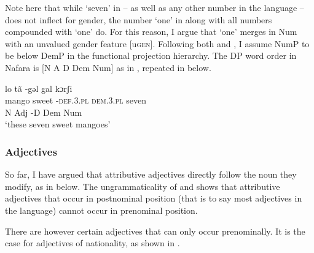 \documentclass[output=paper]{langscibook}
\begin{document}
Note here that while ‘seven’ in  – as well as any other number in the language – does not inflect for gender, the number ‘one’ in  along with all numbers compounded with ‘one’ do. For this reason, I argue that ‘one’ merges in Num with an unvalued gender feature [u\textsc{gen}]. Following both \citet{Greenberg1963} and \citet{Cinque2005}, I assume NumP to be below DemP in the functional projection hierarchy. The DP word order in Nafara is [N A D Dem Num] as in , repeated in  below.

 
\ea\label{ex:baron:8}
\glll lo  tã -gəl  gal  kɔrʃi\\
mango sweet -\textsc{def.3.pl} \textsc{dem.3.pl} seven\\
N  Adj  -D  Dem  Num\\
\glt ‘these seven sweet mangoes’
\z


\subsubsection{Adjectives}
\label{sec:baron:2.1.5}
So far, I have argued that attributive adjectives directly follow the noun they modify, as in  below. The ungrammaticality of  and  shows that attributive adjectives that occur in postnominal position (that is to say most adjectives in the language) cannot occur in prenominal position.
 
\ea\label{ex:baron:9}
 

\z
\z

There are however certain adjectives that can only occur prenominally. It is the case for adjectives of nationality, as shown in .
\end{document}
